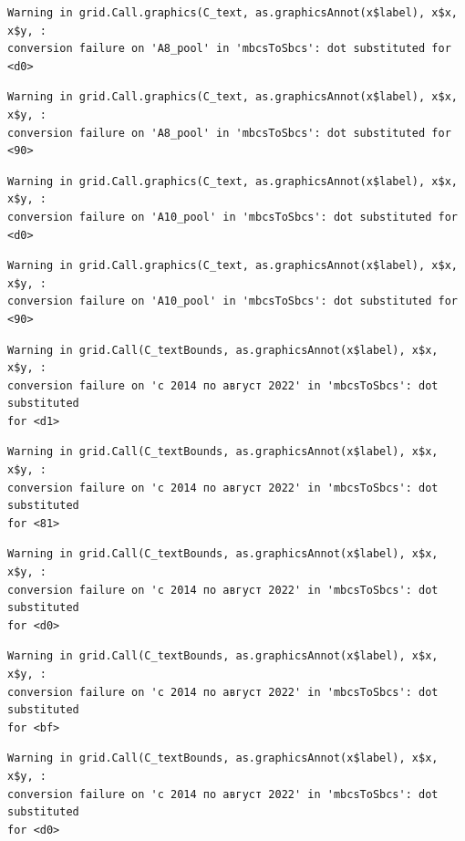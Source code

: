 \documentclass[
  letterpaper,
  DIV=11,
  numbers=noendperiod]{scrartcl}
\begin{document}
\begin{verbatim}
Warning in grid.Call.graphics(C_text, as.graphicsAnnot(x$label), x$x, x$y, :
conversion failure on 'А8_pool' in 'mbcsToSbcs': dot substituted for <d0>
\end{verbatim}

\begin{verbatim}
Warning in grid.Call.graphics(C_text, as.graphicsAnnot(x$label), x$x, x$y, :
conversion failure on 'А8_pool' in 'mbcsToSbcs': dot substituted for <90>
\end{verbatim}

\begin{verbatim}
Warning in grid.Call.graphics(C_text, as.graphicsAnnot(x$label), x$x, x$y, :
conversion failure on 'А10_pool' in 'mbcsToSbcs': dot substituted for <d0>
\end{verbatim}

\begin{verbatim}
Warning in grid.Call.graphics(C_text, as.graphicsAnnot(x$label), x$x, x$y, :
conversion failure on 'А10_pool' in 'mbcsToSbcs': dot substituted for <90>
\end{verbatim}

\begin{verbatim}
Warning in grid.Call(C_textBounds, as.graphicsAnnot(x$label), x$x, x$y, :
conversion failure on 'с 2014 по август 2022' in 'mbcsToSbcs': dot substituted
for <d1>
\end{verbatim}

\begin{verbatim}
Warning in grid.Call(C_textBounds, as.graphicsAnnot(x$label), x$x, x$y, :
conversion failure on 'с 2014 по август 2022' in 'mbcsToSbcs': dot substituted
for <81>
\end{verbatim}

\begin{verbatim}
Warning in grid.Call(C_textBounds, as.graphicsAnnot(x$label), x$x, x$y, :
conversion failure on 'с 2014 по август 2022' in 'mbcsToSbcs': dot substituted
for <d0>
\end{verbatim}

\begin{verbatim}
Warning in grid.Call(C_textBounds, as.graphicsAnnot(x$label), x$x, x$y, :
conversion failure on 'с 2014 по август 2022' in 'mbcsToSbcs': dot substituted
for <bf>
\end{verbatim}

\begin{verbatim}
Warning in grid.Call(C_textBounds, as.graphicsAnnot(x$label), x$x, x$y, :
conversion failure on 'с 2014 по август 2022' in 'mbcsToSbcs': dot substituted
for <d0>
\end{verbatim}
\end{document}
